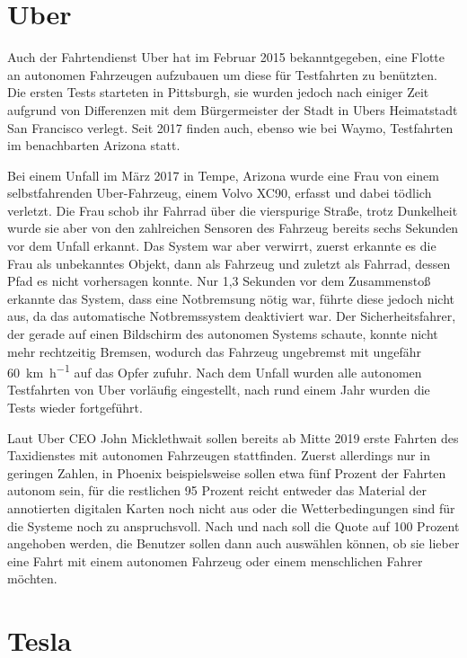 \section{Uber}

Auch der Fahrtendienst Uber hat im Februar 2015 bekanntgegeben, eine Flotte an autonomen Fahrzeugen aufzubauen um diese für Testfahrten zu benützten. Die ersten Tests starteten in Pittsburgh, sie wurden jedoch nach einiger Zeit aufgrund von Differenzen mit dem Bürgermeister der Stadt in Ubers Heimatstadt San Francisco verlegt. Seit 2017 finden auch, ebenso wie bei Waymo, Testfahrten im benachbarten Arizona statt. 

Bei einem Unfall im März 2017 in Tempe, Arizona wurde eine Frau von einem selbstfahrenden Uber-Fahrzeug, einem Volvo XC90, erfasst und dabei tödlich verletzt. Die Frau schob ihr Fahrrad über die vierspurige Straße, trotz Dunkelheit wurde sie aber von den zahlreichen Sensoren des Fahrzeug bereits sechs Sekunden vor dem Unfall erkannt. Das System war aber verwirrt, zuerst erkannte es die Frau als unbekanntes Objekt, dann als Fahrzeug und zuletzt als Fahrrad, dessen Pfad es nicht vorhersagen konnte. Nur 1,3 Sekunden vor dem Zusammenstoß erkannte das System, dass eine Notbremsung nötig war, führte diese jedoch nicht aus, da das automatische Notbremssystem deaktiviert war. Der Sicherheitsfahrer, der gerade auf einen Bildschirm des autonomen Systems schaute, konnte nicht mehr rechtzeitig Bremsen, wodurch das Fahrzeug ungebremst mit ungefähr \SI[per-mode=symbol]{60}{\kilo\metre\per\hour} auf das Opfer zufuhr. Nach dem Unfall wurden alle autonomen Testfahrten von Uber vorläufig eingestellt, nach rund einem Jahr wurden die Tests wieder fortgeführt.

Laut Uber CEO John Micklethwait sollen bereits ab Mitte 2019 erste Fahrten des Taxidienstes mit autonomen Fahrzeugen stattfinden. Zuerst allerdings nur in geringen Zahlen, in Phoenix beispielsweise sollen etwa fünf Prozent der Fahrten autonom sein, für die restlichen 95 Prozent reicht entweder das Material der annotierten digitalen Karten noch nicht aus oder die Wetterbedingungen sind für die Systeme noch zu anspruchsvoll. Nach und nach soll die Quote auf 100 Prozent angehoben werden, die Benutzer sollen dann auch auswählen können, ob sie lieber eine Fahrt mit einem autonomen Fahrzeug oder einem menschlichen Fahrer möchten.

\section{Tesla}

